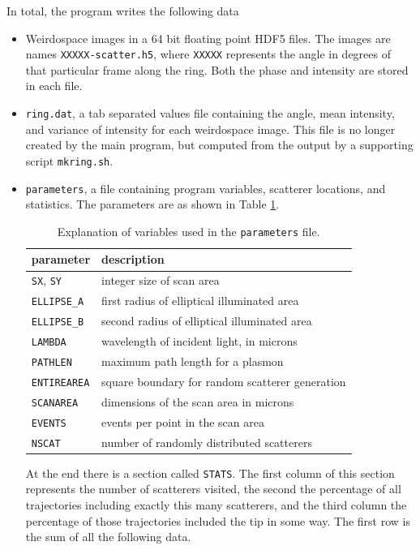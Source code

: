 In total, the program writes the following data
\begin{itemize}
\item Weirdospace images in a 64 bit floating point HDF5 files.  The images
are names {\tt XXXXX-scatter.h5}, where {\tt XXXXX} represents the angle
in degrees of that particular frame along the ring.  Both the phase and
intensity are stored in each file.
\item {\tt ring.dat}, a tab separated values file containing the angle,
mean intensity, and variance of intensity for each weirdospace image.  This
file is no longer created by the main program, but computed from the output
by a supporting script {\tt mkring.sh}.
\item {\tt parameters}, a file containing program variables, scatterer
locations, and statistics.  The parameters are as shown in Table
\ref{tbl:parameters}.
\begin{table}
\label{tbl:parameters}
\begin{center}
\begin{tabular}{ll}
\toprule
parameter & description \\
\midrule
{\tt SX}, {\tt SY} & integer size of scan area\\
{\tt ELLIPSE\_A} & first radius of elliptical illuminated area\\
{\tt ELLIPSE\_B} & second radius of elliptical illuminated area\\
{\tt LAMBDA} & wavelength of incident light, in microns\\
{\tt PATHLEN} & maximum path length for a plasmon\\
{\tt ENTIREAREA} & square boundary for random scatterer generation\\
{\tt SCANAREA} & dimensions of the scan area in microns \\
{\tt EVENTS} & events per point in the scan area\\
{\tt NSCAT} & number of randomly distributed scatterers\\
\bottomrule
\end{tabular}
\end{center}
\caption{Explanation of variables used in the {\tt parameters} file.}
\end{table}
At the end there is a section called {\tt STATS}.  The first column of this
section represents the number of scatterers visited, the second the
percentage of all trajectories including exactly this many scatterers, and
the third column the percentage of those trajectories included the tip in
some way.  The first row is the sum of all the following data.
\end{itemize}

